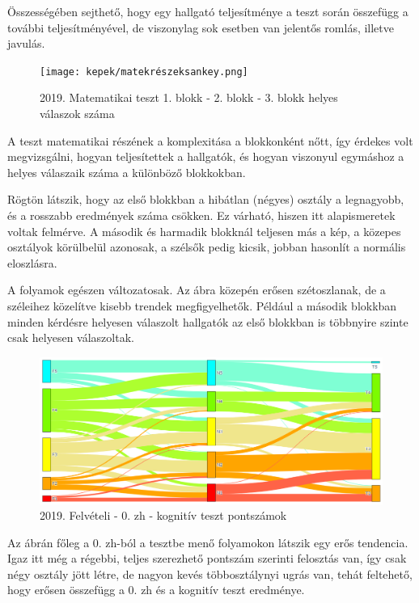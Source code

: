 \documentclass[12pt]{article}
\begin{document}
Összességében sejthető, hogy egy hallgató teljesítménye a teszt során összefügg a további teljesítményével, de viszonylag sok esetben van jelentős romlás, illetve javulás.

\begin{figure}[H]
\centering
\texttt{[image: kepek/matekrészeksankey.png]}
\caption{2019. Matematikai teszt 1. blokk - 2. blokk - 3. blokk helyes válaszok száma}
\label{fig:matekrészeksankey}
\end{figure}

A teszt matematikai részének a komplexitása a blokkonként nőtt, így érdekes volt megvizsgálni, hogyan teljesítettek a hallgatók, és hogyan viszonyul egymáshoz a helyes válaszaik száma a különböző blokkokban.

Rögtön látszik, hogy az első blokkban a hibátlan (négyes) osztály a legnagyobb, és a rosszabb eredmények száma csökken. Ez várható, hiszen itt alapismeretek voltak felmérve. A második és harmadik blokknál teljesen más a kép, a közepes osztályok körülbelül azonosak, a szélsők pedig kicsik, jobban hasonlít a normális eloszlásra.

A folyamok egészen változatosak. Az ábra közepén erősen szétoszlanak, de a széleihez közelítve kisebb trendek megfigyelhetők. Például a második blokkban minden kérdésre helyesen válaszolt hallgatók az első blokkban is többnyire szinte csak helyesen válaszoltak.

\begin{figure}[H]
\centering
\includegraphics[scale=0.573]{kepek/2019_old_felvi_0zh_teszt.png}
\caption{2019. Felvételi - 0. zh - kognitív teszt pontszámok}
\label{fig:2019_old_felvi_0zh_teszt}
\end{figure}

Az ábrán főleg a 0. zh-ból a tesztbe menő folyamokon látszik egy erős tendencia. Igaz itt még a régebbi, teljes szerezhető pontszám szerinti felosztás van, így csak négy osztály jött létre, de nagyon kevés többosztálynyi ugrás van, tehát feltehető, hogy erősen összefügg a 0. zh és a kognitív teszt eredménye.
\end{document}
